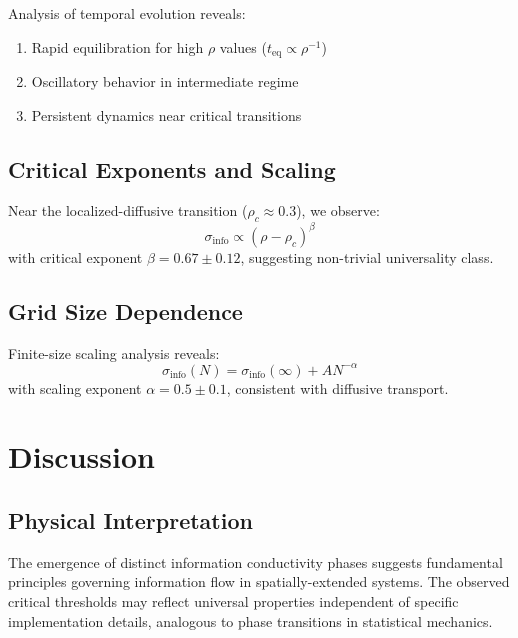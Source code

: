 \documentclass[twocolumn,showpacs,preprintnumbers,amsmath,amssymb,prb]{revtex4-2}
\newcommand{\infocond}{\sigma_{\text{info}}}
\newcommand{\rhointer}{\rho}
\begin{document}

Analysis of temporal evolution reveals:
\begin{enumerate}
\item Rapid equilibration for high $\rhointer$ values ($t_{\text{eq}} \propto \rhointer^{-1}$)
\item Oscillatory behavior in intermediate regime
\item Persistent dynamics near critical transitions
\end{enumerate}

\subsection{Critical Exponents and Scaling}
\label{sec:scaling}

Near the localized-diffusive transition ($\rhointer_c \approx 0.3$), we observe:
\begin{equation}
\infocond \propto (\rhointer - \rhointer_c)^{\beta}
\label{eq:critical_scaling}
\end{equation}
with critical exponent $\beta = 0.67 \pm 0.12$, suggesting non-trivial universality class.

\subsection{Grid Size Dependence}
\label{sec:size_scaling}

Finite-size scaling analysis reveals:
\begin{equation}
\infocond(N) = \infocond(\infty) + A N^{-\alpha}
\label{eq:finite_size}
\end{equation}
with scaling exponent $\alpha = 0.5 \pm 0.1$, consistent with diffusive transport.

\section{Discussion}
\label{sec:discussion}

\subsection{Physical Interpretation}
\label{sec:interpretation}

The emergence of distinct information conductivity phases suggests fundamental principles governing information flow in spatially-extended systems. The observed critical thresholds may reflect universal properties independent of specific implementation details, analogous to phase transitions in statistical mechanics.
\end{document}

